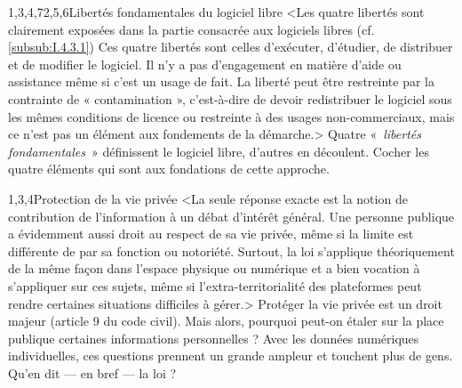 \begin{quiz}[title={Entrailles et contexte d'un objet numérique}]
\begin{quizquestion}[b]{1,3,4,7}{2,5,6}{Libertés fondamentales du logiciel libre}
<Les quatre libertés sont clairement exposées dans la partie consacrée aux logiciels libres (cf. \cref{subsub:I.4.3.1})
Ces quatre libertés sont celles d'exécuter, d'étudier, de distribuer et de modifier le logiciel.
Il n'y a pas d'engagement en matière d'aide ou assistance même si c'est un usage de fait.
La liberté peut être restreinte par la contrainte de « contamination », c'est-à-dire de devoir redistribuer le logiciel sous les mêmes conditions de licence ou restreinte à des usages non-commerciaux, mais ce n'est pas un élément aux fondements de la démarche.>
Quatre «~\emph{libertés fondamentales}~» définissent le logiciel libre, d'autres en découlent.
Cocher les quatre éléments qui sont aux fondations de cette approche.
\end{quizquestion}

\begin{quizquestion*}{2}{1,3,4}{Protection de la vie privée}
<La seule réponse exacte est la notion de contribution de l'information à un débat d'intérêt général.
Une personne publique a évidemment aussi droit au respect de sa vie privée, même si la limite est différente de par sa fonction ou notoriété.
Surtout, la loi s'applique théoriquement de la même façon dans l'espace physique ou numérique et a bien vocation à s'appliquer sur ces sujets, même si l'extra-territorialité des plateformes peut rendre certaines situations difficiles à gérer.>
Protéger la vie privée est un droit majeur (article 9 du code civil). Mais alors, pourquoi peut-on étaler sur la place publique certaines informations personnelles ?
Avec les données numériques individuelles, ces questions prennent un grande ampleur et touchent plus de gens.
Qu'en dit --- en bref --- la loi ?
\end{quizquestion*}
\end{quiz}


